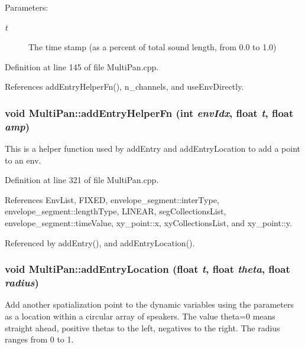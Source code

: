 \begin{Desc}
\item[Parameters:]
\begin{description}
\item[{\em t}]The time stamp (as a percent of total sound length, from 0.0 to 1.0) \end{description}
\end{Desc}


Definition at line 145 of file Multi\-Pan.cpp.

References add\-Entry\-Helper\-Fn(), n\_\-channels, and use\-Env\-Directly.\hypertarget{classMultiPan_d0}{
\subsubsection[addEntryHelperFn]{\setlength{\rightskip}{0pt plus 5cm}void Multi\-Pan::add\-Entry\-Helper\-Fn (int {\em env\-Idx}, float {\em t}, float {\em amp})}}
\label{classMultiPan_d0}


This is a helper function used by add\-Entry and add\-Entry\-Location to add a point to an env. 

Definition at line 321 of file Multi\-Pan.cpp.

References Env\-List, FIXED, envelope\_\-segment::inter\-Type, envelope\_\-segment::length\-Type, LINEAR, seg\-Collections\-List, envelope\_\-segment::time\-Value, xy\_\-point::x, xy\-Collections\-List, and xy\_\-point::y.

Referenced by add\-Entry(), and add\-Entry\-Location().\hypertarget{classMultiPan_a5}{
\subsubsection[addEntryLocation]{\setlength{\rightskip}{0pt plus 5cm}void Multi\-Pan::add\-Entry\-Location (float {\em t}, float {\em theta}, float {\em radius})}}
\label{classMultiPan_a5}


Add another spatialization point to the dynamic variables using the parameters as a location within a circular array of speakers. The value theta=0 means straight ahead, positive thetas to the left, negatives to the right. The radius ranges from 0 to 1.

